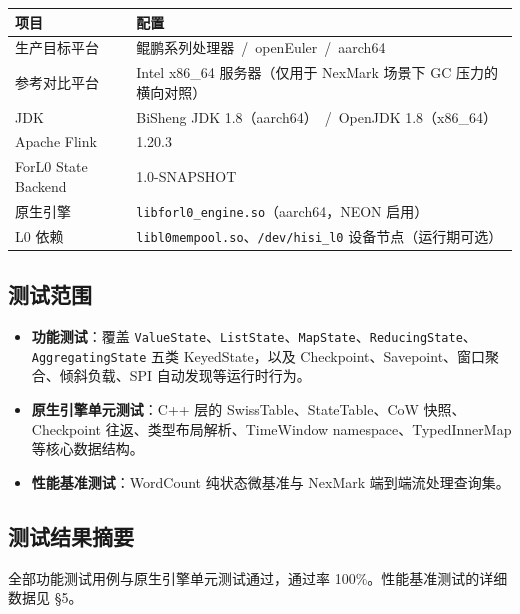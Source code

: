 \documentclass[a4paper,11pt]{article}
\newcommand{\project}{ForL0 State Backend}
\begin{document}
\begin{table}[H]
\centering
\small
\begin{tabularx}{\textwidth}{L{3.2cm} X}
\toprule
\textbf{项目} & \textbf{配置} \\
\midrule
生产目标平台 & 鲲鹏系列处理器 \,/\, openEuler \,/\, aarch64 \\
参考对比平台 & Intel x86\_64 服务器（仅用于 NexMark 场景下 GC 压力的横向对照） \\
JDK & BiSheng JDK 1.8（aarch64） \,/\, OpenJDK 1.8（x86\_64） \\
Apache Flink & 1.20.3 \\
\project{} & 1.0-SNAPSHOT \\
原生引擎 & \texttt{libforl0\_engine.so}（aarch64，NEON 启用） \\
L0 依赖 & \texttt{libl0mempool.so}、\texttt{/dev/hisi\_l0} 设备节点（运行期可选） \\
\bottomrule
\end{tabularx}
\end{table}

\subsection{测试范围}

\begin{itemize}
  \item \textbf{功能测试}：覆盖 \texttt{ValueState}、\texttt{ListState}、\texttt{MapState}、\texttt{ReducingState}、\texttt{AggregatingState} 五类 KeyedState，以及 Checkpoint、Savepoint、窗口聚合、倾斜负载、SPI 自动发现等运行时行为。
  \item \textbf{原生引擎单元测试}：C++ 层的 SwissTable、StateTable、CoW 快照、Checkpoint 往返、类型布局解析、TimeWindow namespace、TypedInnerMap 等核心数据结构。
  \item \textbf{性能基准测试}：WordCount 纯状态微基准与 NexMark 端到端流处理查询集。
\end{itemize}

\subsection{测试结果摘要}

全部功能测试用例与原生引擎单元测试通过，通过率 100\%。性能基准测试的详细数据见 \S5。
\end{document}
